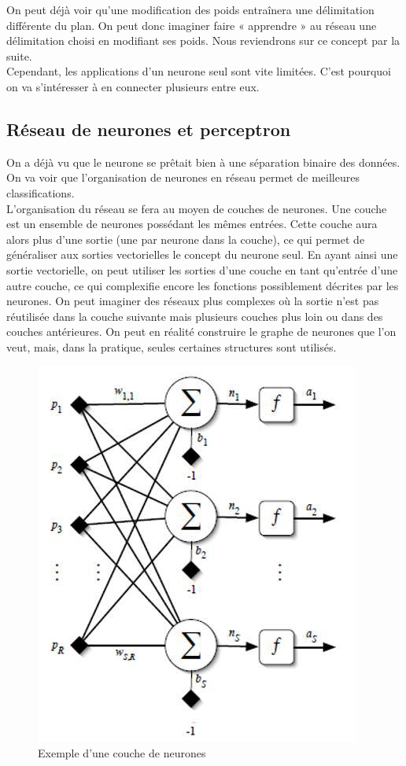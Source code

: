On peut déjà voir qu’une modification des poids entraînera une délimitation différente du plan. On peut donc imaginer faire « apprendre » au réseau une délimitation choisi en modifiant ses poids. Nous reviendrons sur ce concept par la suite.\\
Cependant, les applications d’un neurone seul sont vite limitées. C’est pourquoi on va s’intéresser à en connecter plusieurs entre eux.

\subsection{Réseau de neurones et perceptron} %
\label{sub:reseau_de_neurones}
On a déjà vu que le neurone se prêtait bien à une séparation binaire des données. On va voir que l’organisation de neurones en réseau permet de meilleures classifications.\\
L’organisation du réseau se fera au moyen de couches de neurones. Une couche est un ensemble de neurones possédant les mêmes entrées. Cette couche aura alors plus d'une sortie (une par neurone dans la couche), ce qui permet de généraliser aux sorties vectorielles le concept du neurone seul. En ayant ainsi une sortie vectorielle, on peut utiliser les sorties d'une couche en tant qu'entrée d'une autre couche, ce qui complexifie encore les fonctions possiblement décrites par les neurones.
On peut imaginer des réseaux plus complexes où la sortie n'est pas réutilisée dans la couche suivante mais plusieurs couches plus loin ou dans des couches antérieures. On peut en réalité construire le graphe de neurones que l'on veut, mais, dans la pratique, seules certaines structures sont utilisés. 

\begin{figure}[ht]
  \centerline{\includegraphics[width=0.5\linewidth]{fig/schemacouche.jpg}}
  \caption{Exemple d'une couche de neurones}
  \label{fig:couche}
\end{figure}

